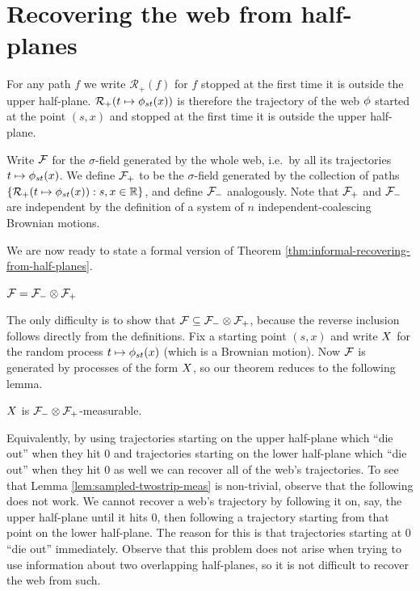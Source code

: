 \newcommand{\indepbm}{\psi}
\newcommand{\toinP}{\overset{\P}\to}
\newcommand{\statementoflemresampledetosampled}{$\resamplede \toinP \sampled$ as $\epsilon \to 0$}
{
\section{Recovering the web from half-planes}
\label{sec:recovering-from-half-planes}

\newcommand{\restrictupper}{\mathcal{R}_{+}}

  For any path $f$ we write $\restrictupper(f)$ for $f$ stopped at the
  first time it is outside the upper half-plane.
  $\restrictupper(t \mapsto \web{s}{t}{x})$ is therefore the trajectory of the
  web $\phi$ started at the point $(s,x)$ and stopped at the first
  time it is outside the upper half-plane.

  Write $\mathcal{F}$ for the $\sigma$-field generated by the
  whole web, i.e.\ by all its trajectories $t \mapsto \phi_{{s}{t}}(x)$.
  We define $\mathcal{F}_{+}$ to be the $\sigma$-field generated by the
  collection of paths $\{\restrictupper(t \mapsto \web{s}{t}{x}) : s,x
  \in \R \}$, and define $\mathcal{F}_{-}$ analogously.
  Note that $\mathcal{F}_{+}$ and $\mathcal{F}_{-}$ are independent by the definition of
  a system of $n$ independent-coalescing Brownian motions.

  We are now ready to state a formal version of Theorem
  \ref{thm:informal-recovering-from-half-planes}.

\begin{theorem}\label{thm:recoveringfromhalfplanes}
  $\mathcal{F} = \mathcal{F}_{-} \otimes \mathcal{F}_{+}$
\end{theorem}

The only difficulty is to show that $\mathcal{F} \subseteq \mathcal{F}_{-} \otimes \mathcal{F}_{+}$,
because the reverse inclusion follows directly from the definitions.
Fix a starting point $(s,x)$ and write $X$ for the random
process $t \mapsto \phi_{{s}{t}}(x)$ (which is a Brownian motion).  Now
$\mathcal{F}$ is generated by processes of the form $X$, so
our theorem reduces to the following lemma.

\begin{lemma}
  \label{lem:sampled-twostrip-meas}
  $X$ is $\mathcal{F}_{-} \otimes \mathcal{F}_{+}$-measurable.
\end{lemma}

Equivalently, by using trajectories starting on the upper half-plane
which ``die out'' when they hit $0$ and trajectories starting on
the lower half-plane which ``die out'' when they hit $0$ as well we
can recover all of the web's trajectories.
To see that Lemma \ref{lem:sampled-twostrip-meas} is non-trivial,
observe that the following does not work. We cannot recover a web's
trajectory by following it on, say, the upper half-plane until it
hits 0, then following a trajectory starting from that point on the
lower half-plane. The reason for this is that trajectories starting at
0 ``die out'' immediately. Observe that this problem does not arise when
trying to use information about two overlapping half-planes, so it is
not difficult to recover the web from such.

}
